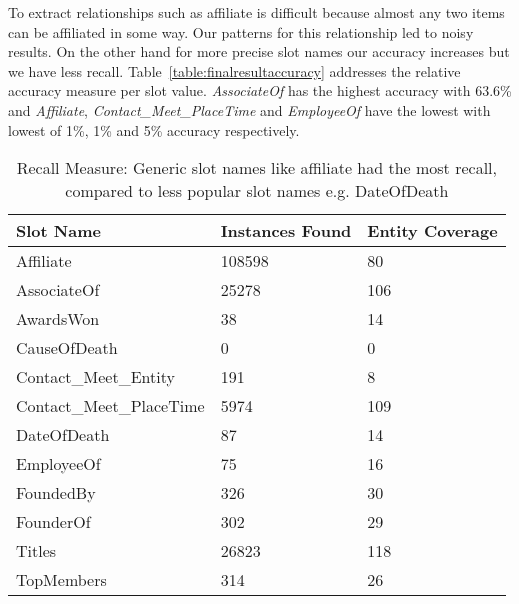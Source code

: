 To extract relationships such as affiliate is difficult because almost any
two items can be affiliated in some way.
Our patterns for this relationship led to noisy results.
On the other hand for more precise slot names our accuracy increases but we have less recall.
Table~\ref{table:finalresultaccuracy} addresses the relative accuracy measure per slot value.
\textit{AssociateOf} has the highest accuracy with 63.6\% and  \textit{Affiliate}, \textit{Contact\_Meet\_PlaceTime} and \textit{EmployeeOf} have the lowest with lowest of 1\%, 1\% and 5\% accuracy respectively.


\begin{table}
\caption{Recall Measure: Generic slot names like affiliate had the most recall, compared to less popular slot names e.g. DateOfDeath}
\centering
\label{table:finalresultrecall}
\begin{tabular}{|l|p{13mm}|p{22mm}|}
\hline 
 \textbf{Slot Name} & \textbf{Instances Found} & \textbf{Entity \hspace{5 mm} Coverage} \\ 
\hline 
Affiliate & 108598 & 80 \\ \hline 
AssociateOf & 25278 & 106 \\ \hline 
AwardsWon & 38 & 14 \\ \hline 
CauseOfDeath & 0 & 0 \\ \hline 
Contact\_Meet\_Entity & 191 & 8 \\ \hline 
Contact\_Meet\_PlaceTime & 5974 & 109 \\ \hline 
DateOfDeath & 87 & 14 \\ \hline 
EmployeeOf & 75 & 16 \\ \hline 
FoundedBy & 326 & 30 \\ \hline 
FounderOf & 302 &  29 \\ \hline 
Titles & 26823 & 118 \\ \hline 
TopMembers & 314 & 26 \\ \hline 

\end{tabular} 




\end{table}
